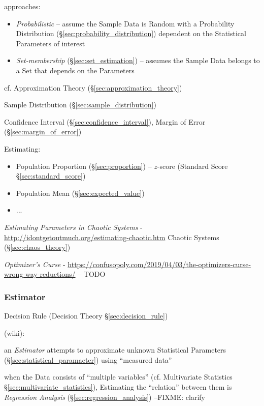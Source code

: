 approaches:
\begin{itemize}
  \item \emph{Probabilistic} -- assume the Sample Data is Random with a
    Probability Distribution (\S\ref{sec:probability_distribution}) dependent on
    the Statistical Parameters of interest
  \item \emph{Set-membership} (\S\ref{sec:set_estimation}) -- assumes the
    Sample Data belongs to a Set that depends on the Parameters
\end{itemize}

\fist cf. Approximation Theory (\S\ref{sec:approximation_theory})

Sample Distribution (\S\ref{sec:sample_distribution})

Confidence Interval (\S\ref{sec:confidence_interval}), Margin of Error
(\S\ref{sec:margin_of_error})

Estimating:
\begin{itemize}
  \item Population Proportion (\S\ref{sec:proportion}) -- $z$-score (Standard
    Score \S\ref{sec:standard_score})
  \item Population Mean (\S\ref{sec:expected_value})
  \item ...
\end{itemize}

\emph{Estimating Parameters in Chaotic Systems} -
\url{http://idontgetoutmuch.org/estimating-chaotic.htm} \fist Chaotic Systems
(\S\ref{sec:chaos_theory})

\asterism

\emph{Optimizer's Curse} -
\url{https://confusopoly.com/2019/04/03/the-optimizers-curse-wrong-way-reductions/}
-- TODO



\subsubsection{Estimator}\label{sec:estimator}

\fist Decision Rule (Decision Theory \S\ref{sec:decision_rule})

(wiki):

an \emph{Estimator} attempts to approximate unknown Statistical Parameters
(\S\ref{sec:statistical_paramaeter}) using ``measured data''

when the Data consists of ``multiple variables'' (cf. Multivariate Statistics
\S\ref{sec:multivariate_statistics}), Estimating the ``relation'' between them
is \emph{Regression Analysis} (\S\ref{sec:regression_analysis})
--FIXME: clarify

